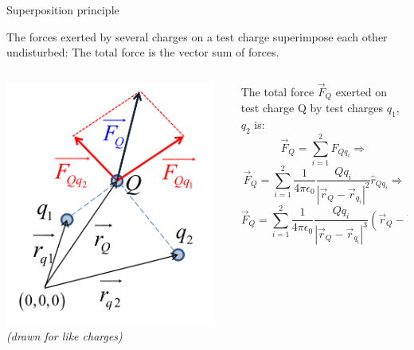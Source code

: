\begin{frame}{Superposition principle}

The forces exerted by several charges on a test charge superimpose each other undisturbed:
The total force is the vector sum of forces.\\
\vspace{0.2cm}
\begin{columns}
  \begin{column}{0.35\textwidth}
   \begin{center}
     \includegraphics[width=0.95\textwidth]{./images/schematics/coulomb_force_superposition.png}\\
     {\it \small (drawn for like charges)}
   \end{center}
  \end{column}
  \begin{column}{0.65\textwidth}
     The total force $\vec{F}_{Q}$ exerted on test charge Q by test charges $q_1$, $q_2$ is:
     \begin{equation*}
       \vec{F}_{Q} = \sum_{i=1}^{2} F_{Qq_{i}} \Rightarrow
     \end{equation*}
     \begin{equation*}
       \vec{F}_{Q} = \sum_{i=1}^{2} \frac{1}{4\pi\epsilon_0}
         \frac{Q q_i}{|\vec{r}_{Q}-\vec{r}_{q_{i}}|^{2}} \hat{r}_{Qq_{i}} \Rightarrow
     \end{equation*}
     \begin{equation*}
        \vec{F}_{Q} = \sum_{i=1}^{2} \frac{1}{4\pi\epsilon_0}
          \frac{Q q_i}{|\vec{r}_{Q}-\vec{r}_{q_{i}}|^{3}} (\vec{r}_{Q}-\vec{r}_{q_{i}})
     \end{equation*}
  \end{column}
\end{columns}

\end{frame}


